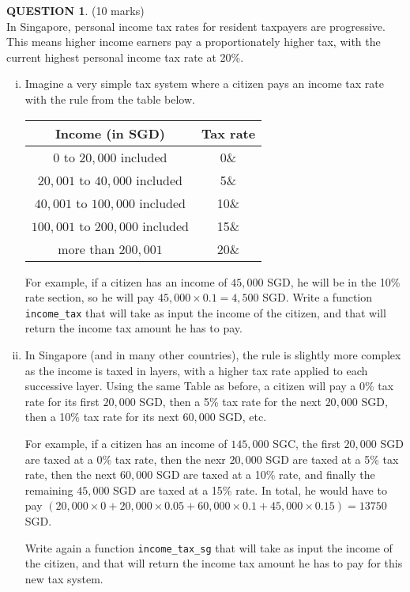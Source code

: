 \documentclass[a4paper,12pt]{article}
\theoremstyle{definition}
\newtheorem{ques}[dummy]{QUESTION}
\theoremstyle{plain}
\newcommand{\ttx}[1]{\texttt{#1}}
\begin{document}
\begin{ques}\hfill (10 marks)\vspace*{1em}\\
	In Singapore, personal income tax rates for resident taxpayers are progressive. This means higher income earners pay a proportionately higher tax, with the current highest personal income tax rate at 20\%.
	
	\begin{enumerate}[(i)]
		\item Imagine a very simple tax system where a citizen pays an income tax rate with the rule from the table below.
		\begin{table}[H]
			\centering
			\begin{tabular}{|c|c|}
				\hline
				\textbf{Income} (in SGD) & \textbf{Tax rate}\\
				\hline
				$0$ to $20,000$ included & 0\&\\
				$20,001$ to $40,000$ included & 5\&\\
				$40,001$ to $100,000$ included & 10\&\\
				$100,001$ to $200,000$ included & 15\&\\
				more than $200,001$ & 20\&\\
			\end{tabular}
		\end{table}
		For example, if a citizen has an income of $45,000$ SGD, he will be in the 10\% rate section, so he will pay $45,000\times 0.1 = 4,500$ SGD. Write a function \ttx{income\_tax} that will take as input the income of the citizen, and that will return the income tax amount he has to pay.
		
		
		\item In Singapore (and in many other countries), the rule is slightly more complex as the income is taxed in layers, with a higher tax rate applied to each successive layer. Using the same Table as before, a citizen will pay a 0\% tax rate for its first $20,000$ SGD, then a 5\% tax rate for the next $20,000$ SGD, then a 10\% tax rate for its next $60,000$ SGD, etc.
		
		For example, if a citizen has an income of $145,000$ SGC, the first $20,000$ SGD are taxed at a 0\% tax rate, then the nexr $20,000$ SGD are taxed at a 5\% tax rate, then the next $60,000$ SGD are taxed at a 10\% rate, and finally the remaining $45,000$ SGD are taxed at a 15\% rate. In total, he would have to pay $(20,000\times 0 + 20,000\times 0.05 + 60,000 \times 0.1 + 45,000\times 0.15) = 13750$ SGD.
		
		Write again a function \ttx{income\_tax\_sg} that will take as input the income of the citizen, and that will return the income tax amount he has to pay for this new tax system. 
	\end{enumerate}
\end{ques}
\end{document}
